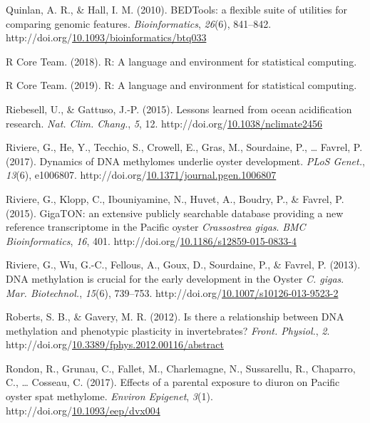 \documentclass [11pt, proquest] {uwthesis}[2015/03/03]
\newlength{\cslhangindent}
\newenvironment{CSLReferences}%
{\setlength{\parindent}{0pt}%
\everypar{\setlength{\hangindent}{\cslhangindent}}\ignorespaces}%
{\par}
\begin{document}
\begin{CSLReferences}{1}{0}
\leavevmode\hypertarget{ref-Quinlan2010}{}%
Quinlan, A. R., \& Hall, I. M. (2010). {BEDTools: a flexible suite of utilities for comparing genomic features}. \emph{Bioinformatics}, \emph{26}(6), 841--842. http://doi.org/\href{https://doi.org/10.1093/bioinformatics/btq033}{10.1093/bioinformatics/btq033}

\leavevmode\hypertarget{ref-R_Core_Team2018}{}%
R Core Team. (2018). {R: A language and environment for statistical computing}.

\leavevmode\hypertarget{ref-R_Core_Team2019}{}%
R Core Team. (2019). {R: A language and environment for statistical computing}.

\leavevmode\hypertarget{ref-Riebesell2015}{}%
Riebesell, U., \& Gattuso, J.-P. (2015). {Lessons learned from ocean acidification research}. \emph{Nat. Clim. Chang.}, \emph{5}, 12. http://doi.org/\href{https://doi.org/10.1038/nclimate2456}{10.1038/nclimate2456}

\leavevmode\hypertarget{ref-Riviere2017}{}%
Riviere, G., He, Y., Tecchio, S., Crowell, E., Gras, M., Sourdaine, P., \ldots{} Favrel, P. (2017). {Dynamics of DNA methylomes underlie oyster development}. \emph{PLoS Genet.}, \emph{13}(6), e1006807. http://doi.org/\href{https://doi.org/10.1371/journal.pgen.1006807}{10.1371/journal.pgen.1006807}

\leavevmode\hypertarget{ref-Riviere2015}{}%
Riviere, G., Klopp, C., Ibouniyamine, N., Huvet, A., Boudry, P., \& Favrel, P. (2015). {GigaTON: an extensive publicly searchable database providing a new reference transcriptome in the Pacific oyster \emph{Crassostrea gigas}}. \emph{BMC Bioinformatics}, \emph{16}, 401. http://doi.org/\href{https://doi.org/10.1186/s12859-015-0833-4}{10.1186/s12859-015-0833-4}

\leavevmode\hypertarget{ref-Riviere2013}{}%
Riviere, G., Wu, G.-C., Fellous, A., Goux, D., Sourdaine, P., \& Favrel, P. (2013). {DNA methylation is crucial for the early development in the Oyster \emph{C. gigas}}. \emph{Mar. Biotechnol.}, \emph{15}(6), 739--753. http://doi.org/\href{https://doi.org/10.1007/s10126-013-9523-2}{10.1007/s10126-013-9523-2}

\leavevmode\hypertarget{ref-Roberts2012}{}%
Roberts, S. B., \& Gavery, M. R. (2012). {Is there a relationship between DNA methylation and phenotypic plasticity in invertebrates?} \emph{Front. Physiol.}, \emph{2}. http://doi.org/\href{https://doi.org/10.3389/fphys.2012.00116/abstract}{10.3389/fphys.2012.00116/abstract}

\leavevmode\hypertarget{ref-Rondon2017}{}%
Rondon, R., Grunau, C., Fallet, M., Charlemagne, N., Sussarellu, R., Chaparro, C., \ldots{} Cosseau, C. (2017). {Effects of a parental exposure to diuron on Pacific oyster spat methylome}. \emph{Environ Epigenet}, \emph{3}(1). http://doi.org/\href{https://doi.org/10.1093/eep/dvx004}{10.1093/eep/dvx004}


\end{CSLReferences}
\end{document}
